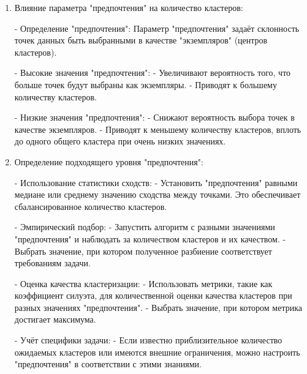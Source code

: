 \begin{enumerate}
    \item Влияние параметра "предпочтения" на количество кластеров:
          
          - Определение "предпочтения": Параметр "предпочтения" задаёт склонность точек данных быть выбранными в качестве "экземпляров" (центров кластеров).
          
          - Высокие значения "предпочтения":
          - Увеличивают вероятность того, что больше точек будут выбраны как экземпляры.
          - Приводят к большему количеству кластеров.
          
          - Низкие значения "предпочтения":
          - Снижают вероятность выбора точек в качестве экземпляров.
          - Приводят к меньшему количеству кластеров, вплоть до одного общего кластера при очень низких значениях.
          
    \item Определение подходящего уровня "предпочтения":
          
          - Использование статистики сходств:
          - Установить "предпочтения" равными медиане или среднему значению сходства между точками. Это обеспечивает сбалансированное количество кластеров.
          
          - Эмпирический подбор:
          - Запустить алгоритм с разными значениями "предпочтения" и наблюдать за количеством кластеров и их качеством.
          - Выбрать значение, при котором полученное разбиение соответствует требованиям задачи.
          
          - Оценка качества кластеризации:
          - Использовать метрики, такие как коэффициент силуэта, для количественной оценки качества кластеров при разных значениях "предпочтения".
          - Выбрать значение, при котором метрика достигает максимума.
          
          - Учёт специфики задачи:
          - Если известно приблизительное количество ожидаемых кластеров или имеются внешние ограничения, можно настроить "предпочтения" в соответствии с этими знаниями.
          
\end{enumerate}


